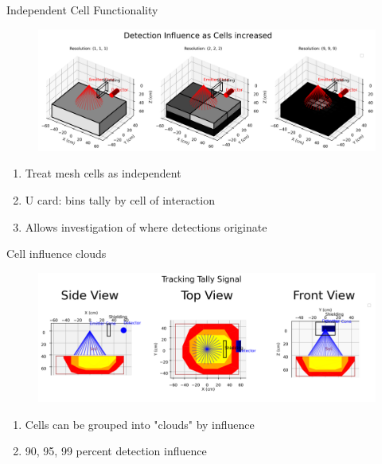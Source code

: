 \documentclass[10pt,hyperref={colorlinks,citecolor=blue,urlcolor=peking_blue,linkcolor=}]{beamer}
\theoremstyle{plain}
\begin{document}
\begin{frame}{Independent Cell Functionality}
\begin{figure}[Cell Ratio Mesh Detection]
\begin{center}
\includegraphics[width=1\linewidth]{../Figures/MCNP/CellRatioMesh.png}
\end{center}
\end{figure}
\begin{enumerate}
\item Treat mesh cells as independent
\item U card: bins tally by cell of interaction
\item Allows investigation of where detections originate
\end{enumerate}
\end{frame}
\begin{frame}{Cell influence clouds}
\begin{figure}[Cell Clouds]
\begin{center}
\includegraphics[width=1\linewidth]{../Figures/MCNP/CellClouds.png}
\end{center}
\end{figure}
\begin{enumerate}
\item Cells can be grouped into "clouds" by influence
\item 90, 95, 99 percent detection influence
\end{enumerate}
\end{frame}
\end{document}
